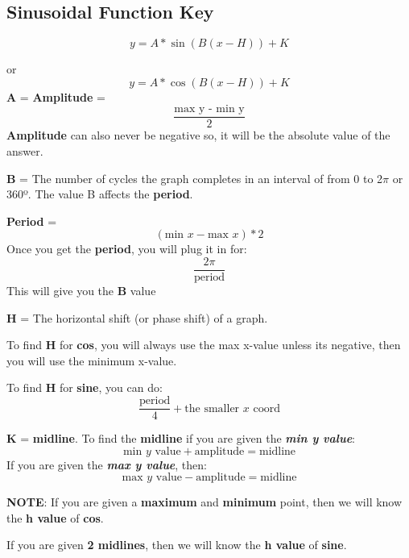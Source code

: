 \documentclass{article}
\begin{document}
\subsection{Sinusoidal Function Key} %
\hfill \break
\begin{tcolorbox}[colback=green!5!white,
                colframe=green!75!black]
  \begin{displaymath}
    y=A*\sin(B(x-H))+K
\end{displaymath}

\hspace{3in} or
\begin{displaymath}
    y=A*\cos(B(x-H))+K
\end{displaymath}
  \tcblower
\textbf{A} = \textbf{Amplitude} =   \[
    \frac{\text{max y - min y}}{\text{2}}
  \]
\textbf{Amplitude} can also never be negative so, it will be the absolute value of the answer.

\hfill \break
\textbf{B} = The number of cycles the graph completes in an interval of from 0 to 2$\pi$ or 360º. The value B affects the \textbf{period}.

\hfill \break
\textbf{Period} = 
\begin{displaymath}
    (\text{min }x-\text{max }x)*2
\end{displaymath}
\hfill \break
Once you get the \textbf{period}, you will plug it in for:
\begin{displaymath}
    \frac{2\pi}{\text{period}}
\end{displaymath}
This will give you the \textbf{B} value
\hfill \break

\textbf{H} = The horizontal shift (or phase shift) of a graph.
\hfill \break

To find \textbf{H} for \textbf{cos}, you will always use the max x-value unless its negative, then you will use the minimum x-value.
\hfill \break

To find \textbf{H} for \textbf{sine}, you can do: \[
    \frac{\text{period}}{\text{4}}+ \text{the smaller }x \text{ coord}
  \]

\textbf{K} = \textbf{midline}. To find the \textbf{midline} if you are given the \textit{\textbf{min y value}}:
\begin{displaymath}
    \text{min }y\text{ value}+\text{amplitude}=\text{midline}
\end{displaymath}
If you are given the \textit{\textbf{max y value}}, then:
\begin{displaymath}
    \text{max }y\text{ value}-\text{amplitude}=\text{midline}
\end{displaymath}

\textbf{NOTE}:
\hfill \break
If you are given a \textbf{maximum} and \textbf{minimum} point, then we will know the \textbf{h value} of \textbf{cos}.
\hfill \break

If you are given \textbf{2 midlines}, then we will know the \textbf{h value} of \textbf{sine}.
\end{tcolorbox} %
\end{document}
